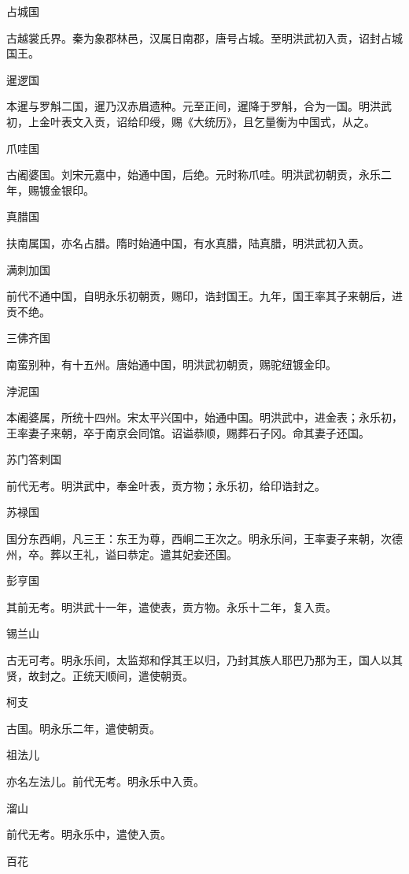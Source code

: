 \documentclass[a4paper,12pt,UTF8,twoside]{ctexbook}
\begin{document}
    占城国
    
    古越裳氏界。秦为象郡林邑，汉属日南郡，唐号占城。至明洪武初入贡，诏封占城国王。
    
    暹逻国
    
    本暹与罗斛二国，暹乃汉赤眉遗种。元至正间，暹降于罗斛，合为一国。明洪武初，上金叶表文入贡，诏给印绶，赐《大统历》，且乞量衡为中国式，从之。
    
    爪哇国
    
    古阇婆国。刘宋元嘉中，始通中国，后绝。元时称爪哇。明洪武初朝贡，永乐二年，赐镀金银印。
    
    真腊国
    
    扶南属国，亦名占腊。隋时始通中国，有水真腊，陆真腊，明洪武初入贡。
    
    满刺加国
    
    前代不通中国，自明永乐初朝贡，赐印，诰封国王。九年，国王率其子来朝后，进贡不绝。
    
    三佛齐国
    
    南蛮别种，有十五州。唐始通中国，明洪武初朝贡，赐驼纽镀金印。
    
    浡泥国
    
    本阇婆属，所统十四州。宋太平兴国中，始通中国。明洪武中，进金表；永乐初，王率妻子来朝，卒于南京会同馆。诏谥恭顺，赐葬石子冈。命其妻子还国。
    
    苏门答剌国
    
    前代无考。明洪武中，奉金叶表，贡方物；永乐初，给印诰封之。
    
    苏禄国
    
    国分东西峒，凡三王：东王为尊，西峒二王次之。明永乐间，王率妻子来朝，次德州，卒。葬以王礼，谥曰恭定。遣其妃妾还国。
    
    彭亨国
    
    其前无考。明洪武十一年，遣使表，贡方物。永乐十二年，复入贡。
    
    锡兰山
    
    古无可考。明永乐间，太监郑和俘其王以归，乃封其族人耶巴乃那为王，国人以其贤，故封之。正统天顺间，遣使朝贡。
    
    柯支
    
    古国。明永乐二年，遣使朝贡。
    
    祖法儿
    
    亦名左法儿。前代无考。明永乐中入贡。
    
    溜山
    
    前代无考。明永乐中，遣使入贡。
    
    百花
    
\end{document}
